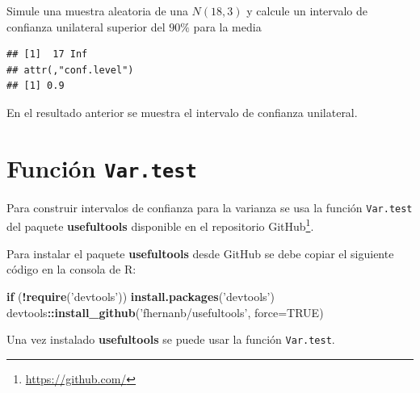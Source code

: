 \documentclass[10pt,]{krantz}
\makeatletter
\newenvironment{Shaded}{\begin{snugshade}}{\end{snugshade}}
\newcommand{\KeywordTok}[1]{\textcolor[rgb]{0.13,0.29,0.53}{\textbf{#1}}}
\newcommand{\DataTypeTok}[1]{\textcolor[rgb]{0.13,0.29,0.53}{#1}}
\newcommand{\DecValTok}[1]{\textcolor[rgb]{0.00,0.00,0.81}{#1}}
\newcommand{\FloatTok}[1]{\textcolor[rgb]{0.00,0.00,0.81}{#1}}
\newcommand{\StringTok}[1]{\textcolor[rgb]{0.31,0.60,0.02}{#1}}
\newcommand{\OtherTok}[1]{\textcolor[rgb]{0.56,0.35,0.01}{#1}}
\newcommand{\ControlFlowTok}[1]{\textcolor[rgb]{0.13,0.29,0.53}{\textbf{#1}}}
\newcommand{\OperatorTok}[1]{\textcolor[rgb]{0.81,0.36,0.00}{\textbf{#1}}}
\newcommand{\NormalTok}[1]{#1}
\renewcommand{\href}[2]{#2\footnote{\url{#1}}}
\newenvironment{kframe}{%
\medskip{}
\setlength{\fboxsep}{.8em}
 \def\at@end@of@kframe{}%
 \ifinner\ifhmode%
  \def\at@end@of@kframe{\end{minipage}}%
  \begin{minipage}{\columnwidth}%
 \fi\fi%
 \def\FrameCommand##1{\hskip\@totalleftmargin \hskip-\fboxsep
 \colorbox{shadecolor}{##1}\hskip-\fboxsep
     \hskip-\linewidth \hskip-\@totalleftmargin \hskip\columnwidth}%
 \MakeFramed {\advance\hsize-\width
   \@totalleftmargin\z@ \linewidth\hsize
   \@setminipage}}%
 {\par\unskip\endMakeFramed%
 \at@end@of@kframe}
\renewenvironment{Shaded}{\begin{kframe}}{\end{kframe}}
\makeatother
\begin{document}
Simule una muestra aleatoria de una \(N(18, 3)\) y calcule un intervalo
de confianza unilateral superior del \(90\%\) para la media

\begin{Shaded}
\end{Shaded}

\begin{verbatim}
## [1]  17 Inf
## attr(,"conf.level")
## [1] 0.9
\end{verbatim}

En el resultado anterior se muestra el intervalo de confianza
unilateral.

\section{\texorpdfstring{Función
\texttt{Var.test}}{Función Var.test}}\label{funcion-var.test}

Para construir intervalos de confianza para la varianza se usa la
función \texttt{Var.test} del paquete \textbf{usefultools}
\citep{R-usefultools} disponible en el repositorio
\href{https://github.com/}{GitHub}.

Para instalar el paquete \textbf{usefultools} desde GitHub se debe
copiar el siguiente código en la consola de R:

\begin{Shaded}
\begin{Highlighting}[]
\ControlFlowTok{if}\NormalTok{ (}\OperatorTok{!}\KeywordTok{require}\NormalTok{(}\StringTok{'devtools'}\NormalTok{)) }\KeywordTok{install.packages}\NormalTok{(}\StringTok{'devtools'}\NormalTok{)}
\NormalTok{devtools}\OperatorTok{::}\KeywordTok{install_github}\NormalTok{(}\StringTok{'fhernanb/usefultools'}\NormalTok{, }\DataTypeTok{force=}\OtherTok{TRUE}\NormalTok{)}
\end{Highlighting}
\end{Shaded}

Una vez instalado \textbf{usefultools} se puede usar la función
\texttt{Var.test}.
\end{document}
